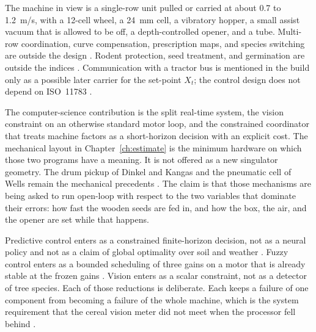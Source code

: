 The machine in view is a single-row unit pulled or carried at about 0.7 to 1.2~m/s, with a 12-cell wheel, a 24~mm cell, a vibratory hopper, a small assist vacuum that is allowed to be off, a depth-controlled opener, and a tube. Multi-row coordination, curve compensation, prescription maps, and species switching are outside the design \cite{aces2024,dambroz2025,stafford2000,gebbers2010}. Rodent protection, seed treatment, and germination are outside the indices \cite{lof2019,grossnickle2012}. Communication with a tractor bus is mentioned in the build only as a possible later carrier for the set-point $X_t$; the control design does not depend on ISO~11783 \cite{iso11783}.

The computer-science contribution is the split real-time system, the vision constraint on an otherwise standard motor loop, and the constrained coordinator that treats machine factors as a short-horizon decision with an explicit cost. The mechanical layout in Chapter~\ref{ch:estimate} is the minimum hardware on which those two programs have a meaning. It is not offered as a new singulator geometry. The drum pickup of Dinkel and Kangas and the pneumatic cell of Wells remain the mechanical precedents \cite{dinkel1991,wells1990}. The claim is that those mechanisms are being asked to run open-loop with respect to the two variables that dominate their errors: how fast the wooden seeds are fed in, and how the box, the air, and the opener are set while that happens.

Predictive control enters as a constrained finite-horizon decision, not as a neural policy and not as a claim of global optimality over soil and weather \cite{mayne2000,qin2003}. Fuzzy control enters as a bounded scheduling of three gains on a motor that is already stable at the frozen gains \cite{zadeh1965,mamdani1974,takagi1985,khalil2002}. Vision enters as a scalar constraint, not as a detector of tree species. Each of those reductions is deliberate. Each keeps a failure of one component from becoming a failure of the whole machine, which is the system requirement that the cereal vision meter did not meet when the processor fell behind \cite{borja2021}.


